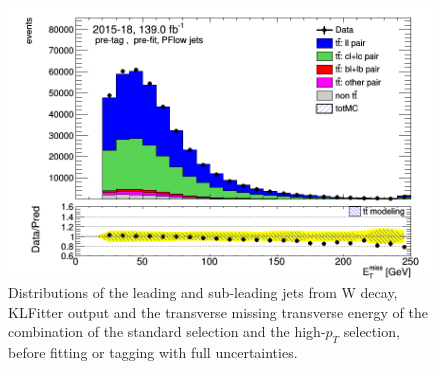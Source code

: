 \documentclass[letterpaper,12pt]{article}
\begin{document}
\begin{figure}
\begin{minipage}[b]{.45\textwidth}
	\end{minipage}\hfill
	\begin{minipage}[b]{.45\textwidth}
	\centering
	\includegraphics[width=1\textwidth]{Oct_distributions/pretagNoRwDL1rwithhighpTPFlow_scaledall/DataMC_MET.png}
	\end{minipage}
	\caption{Distributions of the leading and sub-leading jets from W decay, KLFitter output and the 
	transverse missing transverse energy of the combination of the standard selection and the 
	high-$p_T$ selection, before fitting or tagging with full uncertainties.} \label{fig:jets_PFlow}
	\end{figure}
	
	
	
\end{document}
